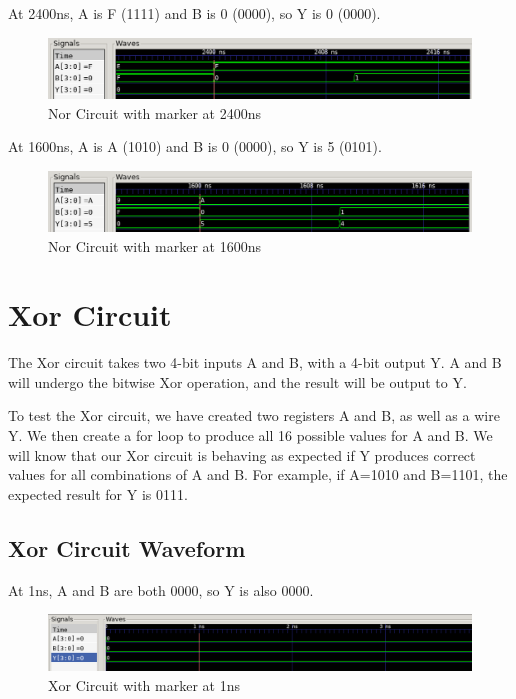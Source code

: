 \documentclass[12pt]{article}
\begin{document}
At 2400ns, A is F (1111) and B is 0 (0000), so Y is 0 (0000).
\begin{figure}[H]
    \centering
    \includegraphics[width = 1.0\textwidth]{Nor/nor_wave1.PNG}
    \caption{Nor Circuit with marker at 2400ns}
    \label{fig:enter-label}
\end{figure}

At 1600ns, A is A (1010) and B is 0 (0000), so Y is 5 (0101).
\begin{figure}[H]
    \centering
    \includegraphics[width = 1.0\textwidth]{Nor/nor_wave2.PNG}
    \caption{Nor Circuit with marker at 1600ns}
    \label{fig:enter-label}
\end{figure}

\section{Xor Circuit}
The Xor circuit takes two 4-bit inputs A and B, with a 4-bit output Y. A and B will undergo the bitwise Xor operation, and the result will be output to Y.
 

To test the Xor circuit, we have created two registers A and B, as well as a wire Y. We then create a for loop to produce all 16 possible values for A and B. We will know that our Xor circuit is behaving as expected if Y produces correct values for all combinations of A and B. For example, if A=1010 and B=1101, the expected result for Y is 0111. 
 

\subsection{Xor Circuit Waveform} 

At 1ns, A and B are both 0000, so Y is also 0000.
\begin{figure}[H]
 \centering
 \includegraphics[width = 1.0\textwidth]{Xor/xor_wave.png}
 \caption{Xor Circuit with marker at 1ns}
 \label{fig:enter-label} 
\end{figure} 
\end{document}
